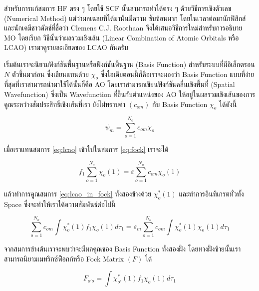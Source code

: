 สำหรับการแก้สมการ HF ตรง ๆ โดยใช้ SCF นั้นสามารถทำได้ตรง ๆ ด้วยวิธีการเชิงตัวเลข (Numerical Method) แต่ว่าผลเฉลยที่ได้มานั้นมีความ%
ซับซ้อนมาก โดยในเวลาต่อมานักฟิสิกส์และนักเคมีชาวดัตช์ที่ชื่อว่า Clemens C.J. Roothaan จึงได้เสนอวิธีการใหม่สำหรับการอธิบาย MO โดยเรียก%
วิธีนั้นว่าผลรวมเชิงเส้น (Linear Combination of Atomic Orbitals หรือ LCAO)\autocite{atkins2010} เรามาดูรายละเอียดของ LCAO
กันครับ

เริ่มต้นเราจะนิยามฟังก์ชันพื้นฐานหรือฟังก์ชันพื้นฐาน (Basis Function) สำหรับระบบที่มีอิเล็กตรอน $N$ ตัวขึ้นมาก่อน ซึ่งเขียนแทนด้วย $\chi_{o}$
ซึ่งไอเดียตอนนี้ก็คือเราจะมองว่า Basis Function แบบที่ง่ายที่สุดที่เราสามารถนำมาใช้ได้นั้นก็คือ AO โดยเราสามารถเขียนฟังก์ชันคลื่นเชิงพื้นที่
(Spatial Wavefunction) ซึ่งเป็น Wavefunction ที่ขึ้นกับตำแหน่งของ AO ให้อยู่ในผลรวมเชิงเส้นของการคูณระหว่างสัมประสิทธิ์เชิงเส้นที่เรา%
ยังไม่ทราบค่า $(c_{om})$ กับ Basis Function $\chi_{o}$ ได้ดังนี้

\begin{equation}\label{eq:lcao}
    \psi_{m} = \sum^{N_{o}}_{o=1} c_{om} \chi_{o}
\end{equation}

\noindent เมื่อเราแทนสมการ \eqref{eq:lcao} เข้าไปในสมการ \eqref{eq:fock} เราจะได้

\begin{equation}\label{eq:lcao_in_fock}
    f_{1} \sum^{N_{o}}_{o=1} \chi_{o}(1) = \varepsilon \sum^{N_{o}}_{o=1} c_{om} \chi_{o}(1)
\end{equation}

\noindent แล้วทำการคูณสมการ \eqref{eq:lcao_in_fock} ทั้งสองข้างด้วย $\chi^{*}_{o}(1)$ และทำการอินทิเกรตทั่วทั้ง Space
ซึ่งจะทำให้เราได้ความสัมพันธ์ต่อไปนี้

\begin{equation}\label{eq:lcao_in_fock_int}
    \sum^{N_{o}}_{o=1} c_{om} \int \chi^{*}_{o}(1) f_{1} \chi_{o}(1) d\tau_{1} =
    \varepsilon_{m} \sum^{N_{o}}_{o=1} c_{om} \int \chi^{*}_{o}(1) \chi_{o}(1) d\tau_{1}
\end{equation}

\noindent จากสมการข้างต้นเราจะพบว่าจะมีผลคูณของ Basis Function ทั้งสองฝั่ง โดยทางฝั่งซ้ายนั้นเราสามารถนิยามเมทริกซ์ฟ็อกก์หรือ Fock
Matrix $(F)$ ได้

\begin{equation}\label{eq:matrix_fock}
    F_{o'o} = \int \chi^{*}_{o'}(1) f_{1} \chi_{o}(1) d\tau_{1}
\end{equation}

